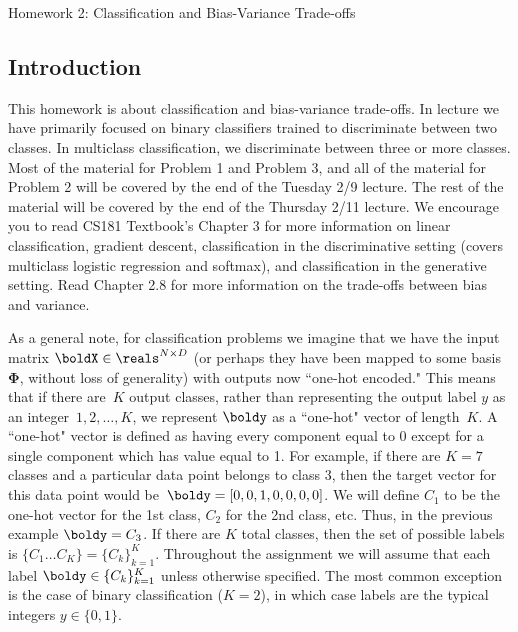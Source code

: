 \documentclass[submit]{harvardml}
\begin{document}
\begin{center}
{\Large Homework 2: Classification and Bias-Variance Trade-offs}\\
\end{center}

\subsection*{Introduction}

This homework is about classification and bias-variance trade-offs. In
lecture we have primarily focused on binary classifiers trained to
discriminate between two classes. In multiclass classification, we
discriminate between three or more classes.  Most of the material for Problem 1 and Problem 3, and all of the material for Problem 2 will be covered by the end of the Tuesday 2/9 lecture. The rest of the material will be covered by the end of the Thursday 2/11 lecture.  We encourage you to read
CS181 Textbook's Chapter 3 for more information on linear
classification, gradient descent, classification in the discriminative
setting (covers multiclass logistic regression and softmax), and
classification in the generative setting. Read Chapter 2.8 for more
information on the trade-offs between bias and variance.

As a general note, for classification problems we imagine that we have
the input matrix $\boldX \in \reals^{N \times D}$ (or perhaps they
have been mapped to some basis $\bm{\Phi}$, without loss of
generality) with outputs now ``one-hot encoded."  This means that if
there are~$K$ output classes, rather than representing the output
label $y$ as an integer~${1,2,\ldots,K}$, we represent $\boldy$ as a
``one-hot" vector of length~$K$. A ``one-hot" vector is defined as
having every component equal to 0 except for a single component which
has value equal to 1.  For example, if there are $K = 7$ classes and a
particular data point belongs to class 3, then the target vector for
this data point would be~$\boldy = [0,0,1,0,0,0,0]$.  We will define
$C_1$ to be the one-hot vector for the 1st class, $C_2$ for the 2nd
class, etc.  Thus, in the previous example $\boldy = C_3$. If there
are $K$ total classes, then the set of possible labels is $\{C_1
\ldots C_K \} = \{C_k\}_{k=1}^K$.  Throughout the assignment we will
assume that each label $\boldy \in \{C_k\}_{k=1}^K$ unless otherwise
specified. The most common exception is the case of binary classification
($K = 2$), in which case labels are the typical integers $y \in \{0, 1\}$.\\
\end{document}
